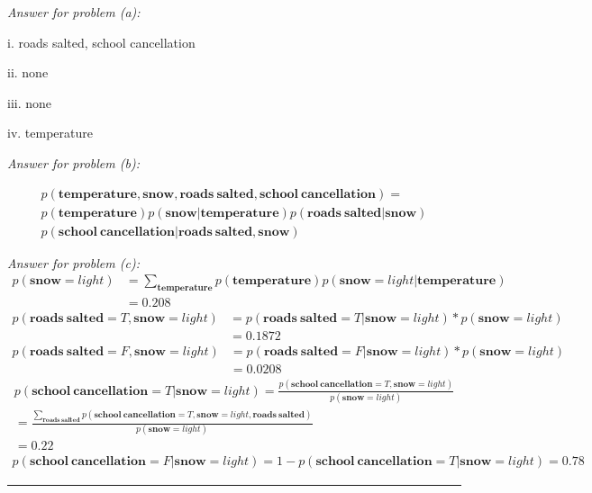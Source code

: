 \documentclass[twoside]{article}
\newenvironment{problem}[2][Problem]{\begin{trivlist}
		\item[\hskip \labelsep {\bfseries #1}\hskip \labelsep {\bfseries #2.}]}{\end{trivlist}}
\newenvironment{solution}{{\bf Solution:}}{\hfill\rule{2mm}{2mm}}
\begin{document}
\begin{problem}{2}
\end{problem} 
\begin{solution}
	
	\emph{Answer for problem (a):}

	i. roads salted, school cancellation
	
	ii. none
	
	iii. none
	
	iv. temperature
	
	\emph{Answer for problem (b):}

	
	\begin{multline*}
	p(\mathbf{temperature, snow, roads\ salted, school\ cancellation}) = \\ p(\mathbf{temperature})p(\mathbf{snow|temperature})p(\mathbf{roads\ salted|snow})\\
	p(\mathbf{school\ cancellation|roads\ salted, snow})
	\end{multline*}
	
	
	\emph{Answer for problem (c):}	
	\begin{align*}
	p(\mathbf{snow} = light) &= \sum_{\mathbf{temperature}}p(\mathbf{temperature})p(\mathbf{snow} = light|\mathbf{temperature}) \\
	&= 0.208
	\end{align*}
	\begin{align*}
	p(\mathbf{roads\ salted} = T, \mathbf{snow} = light) &= p(\mathbf{roads\ salted} = T| \mathbf{snow} = light) * p(\mathbf{snow} = light) \\
	&= 0.1872
	\end{align*}
	\begin{align*}
	p(\mathbf{roads\ salted} = F, \mathbf{snow} = light) &= p(\mathbf{roads\ salted} = F| \mathbf{snow} = light) * p(\mathbf{snow} = light) \\
	&= 0.0208
	\end{align*}
	\begin{align*}
	p(\mathbf{school\ cancellation} = T| \mathbf{snow} = light) = \frac{p(\mathbf{school\ cancellation} = T, \mathbf{snow} = light)}{p( \mathbf{snow} = light)} \\
	= \frac{\sum_{\mathbf{roads\ salted}}p(\mathbf{school\ cancellation} = T, \mathbf{snow} = light, \mathbf{roads\ salted})}{p( \mathbf{snow} = light)} \\
	= 0.22
	\end{align*}
	\begin{align*}
	p(\mathbf{school\ cancellation} = F| \mathbf{snow} = light) = 1 - p(\mathbf{school\ cancellation} = T| \mathbf{snow} = light) = 0.78
	\end{align*}
	
\end{solution}
\end{document}
